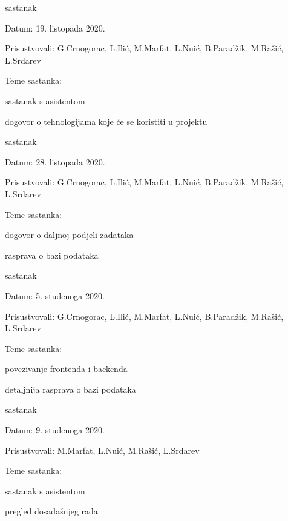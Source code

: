 \begin{packed_enum}
			\item  sastanak
			\item[] \begin{packed_item}
				\item Datum: 19. listopada 2020.
				\item Prisustvovali: G.Crnogorac, L.Ilić, M.Marfat, L.Nuić, B.Paradžik, M.Rašić, L.Srdarev
				\item Teme sastanka:
				\begin{packed_item}
					\item  sastanak s asistentom 
					\item  dogovor o tehnologijama koje će se koristiti u projektu
				\end{packed_item}
			\end{packed_item}
			
			\item  sastanak
			\item[] \begin{packed_item}
				\item Datum: 28. listopada 2020.
				\item Prisustvovali: G.Crnogorac, L.Ilić, M.Marfat, L.Nuić, B.Paradžik, M.Rašić, L.Srdarev
				\item Teme sastanka:
				\begin{packed_item}
					\item  dogovor o daljnoj podjeli zadataka
					\item  rasprava o bazi podataka
				\end{packed_item}
			\end{packed_item}
			
			\item  sastanak
			\item[] \begin{packed_item}
				\item Datum: 5. studenoga 2020.
				\item Prisustvovali: G.Crnogorac, L.Ilić, M.Marfat, L.Nuić, B.Paradžik, M.Rašić, L.Srdarev
				\item Teme sastanka:
				\begin{packed_item}
					\item  povezivanje frontenda i backenda
					\item  detaljnija rasprava o bazi podataka
				\end{packed_item}
			\end{packed_item}	
			
			\item  sastanak
			\item[] \begin{packed_item}
				\item Datum: 9. studenoga 2020.
				\item Prisustvovali: M.Marfat, L.Nuić, M.Rašić, L.Srdarev
				\item Teme sastanka:
				\begin{packed_item}
					\item  sastanak s asistentom
					\item  pregled dosadašnjeg rada
				\end{packed_item}
			\end{packed_item}
		

\end{packed_enum}
